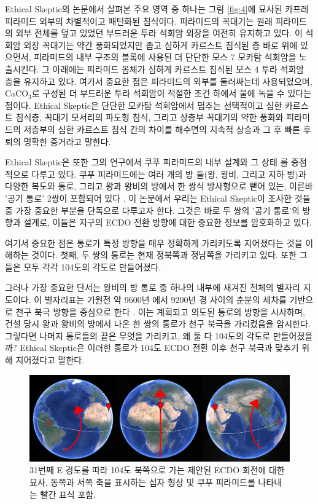 \documentclass[10pt,twocolumn,letterpaper]{article}
\begin{document}
Ethical Skeptic의 논문에서 살펴본 주요 영역 중 하나는 그림 \ref{fig:4}에 묘사된 카프레 피라미드 외부의 차별적이고 패턴화된 침식이다. 피라미드의 꼭대기는 원래 피라미드의 외부 전체를 덮고 있었던 부드러운 투라 석회암 외장을 여전히 유지하고 있다. 이 석회암 외장 꼭대기는 약간 풍화되었지만 좁고 심하게 카르스트 침식된 층 바로 위에 있으면서,  피라미드의 내부 구조의 블록에 사용된 더 단단한 모스 7 모카탐 석회암을 노출시킨다. 그 아래에는 피라미드 몸체가 심하게 카르스트 침식된 모스 4 투라 석회암 층을 유지하고 있다. 여기서 중요한 점은 피라미드의 외부를 둘러싸는데  사용되었으며, CaCO$_3$로 구성된 더 부드러운 투라 석회암이 적절한 조건 하에서 물에 녹을 수 있다는 점이다. Ethical Skeptic은 단단한 모카탐 석회암에서 멈추는 선택적이고 심한 카르스트 침식층, 꼭대기 모서리의 파도형 침식, 그리고 상층부 꼭대기의 약한 풍화와 피라미드의 저층부의 심한 카르스트 침식 간의 차이를 해수면의 지속적 상승과 그 후 빠른 후퇴의 명확한 증거라고 말한다\cite{27}.

Ethical Skeptic은 또한 그의 연구에서 쿠푸 피라미드의 내부 설계와 그 상태 \cite{28}를 중점적으로 다루고 있다. 쿠푸 피라미드에는 여러 개의 방 들(왕, 왕비, 그리고 지하 방)과 다양한 복도와 통로, 그리고 왕과 왕비의 방에서 한 쌍식 방사형으로 뻗어 있는, 이른바  '공기 통로' 2쌍이 포함되어 있다 \cite{29,30}. 이 논문에서 우리는 Ethical Skeptic이 조사한 것들 중 가장 중요한 부분을 단독으로 다루고자 한다. 그것은 바로 두 쌍의 '공기 통로'의 방향과 설계로, 이들은 지구의 ECDO 전환 방향에 대한 중요한 정보를 암호화하고 있다.

여기서 중요한 점은 통로가 특정 방향을 매우 정확하게 가리키도록 지어졌다는 것을 이해하는 것이다. 첫째, 두 쌍의 통로는 현재 정북쪽과 정남쪽을 가리키고 있다. 또한 그들은 모두 각각 104도의 각도로 만들어졌다.

그러나 가장 중요한 단서는 왕비의 방 통로 중 하나의 내부에 새겨진 천체의 별자리 지도이다. 이 별자리표는  기원전 약 9600년 에서 9200년 경 사이의 춘분의 세차를 기반으로 천구 북극 방향을 중심으로 한다 \cite{28}. 이는 계획되고 의도된 통로의 방향을 시사하며, 건설 당시 왕과 왕비의 방에서 나온 한 쌍의 통로가 천구 북극을 가리켰음을 암시한다. 그렇다면 나머지 통로들의 끝은 무엇을 가리키고, 왜 둘 다 104도의 각도로 만들어졌을까? Ethical Skeptic은 이러한 통로가 104도 ECDO 전환 이후 천구 북극과 맞추기 위해 지어졌다고 말한다.

\begin{figure}[t]
\begin{center}
\includegraphics[width=1\textwidth]{drawing.jpg}
\end{center}                                                                                 
   \caption{31번째 E 경도를 따라 104도 북쪽으로 가는 제안된 ECDO 회전에 대한 묘사, 동쪽과 서쪽 축을 표시하는 십자 형상 및 쿠푸 피라미드를 나타내는 빨간 표식 포함.}
\label{fig:6}
\end{figure}
\end{document}
